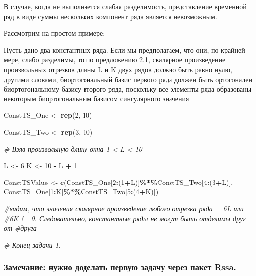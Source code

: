 \documentclass[
]{article}
\newenvironment{Shaded}{\begin{snugshade}}{\end{snugshade}}
\newcommand{\CommentTok}[1]{\textcolor[rgb]{0.56,0.35,0.01}{\textit{#1}}}
\newcommand{\DecValTok}[1]{\textcolor[rgb]{0.00,0.00,0.81}{#1}}
\newcommand{\FunctionTok}[1]{\textcolor[rgb]{0.13,0.29,0.53}{\textbf{#1}}}
\newcommand{\NormalTok}[1]{#1}
\newcommand{\OtherTok}[1]{\textcolor[rgb]{0.56,0.35,0.01}{#1}}
\newcommand{\SpecialCharTok}[1]{\textcolor[rgb]{0.81,0.36,0.00}{\textbf{#1}}}
\begin{document}
В случае, когда не выполняется слабая разделимость, представление
временной ряд в виде суммы нескольких компонент ряда является
невозможным.

Рассмотрим на простом примере:

Пусть дано два константных ряда. Если мы предполагаем, что они, по
крайней мере, слабо разделимы, то по предложению 2.1, скалярное
произведение произвольных отрезков длины L и K двух рядов должно быть
равно нулю, другими словами, биортогональный базис первого ряда должен
быть ортогонален биортогональному базису второго ряда, поскольку все
элементы ряда образованы некоторым биортогональным базисом сингулярного
значения

\begin{Shaded}
\begin{Highlighting}[]
\NormalTok{ConstTS\_One }\OtherTok{\textless{}{-}} \FunctionTok{rep}\NormalTok{(}\DecValTok{2}\NormalTok{, }\DecValTok{10}\NormalTok{)}

\NormalTok{ConstTS\_Two }\OtherTok{\textless{}{-}} \FunctionTok{rep}\NormalTok{(}\DecValTok{3}\NormalTok{, }\DecValTok{10}\NormalTok{)}

\CommentTok{\# Взяв произвольную длину окна 1 \textless{} L \textless{} 10}

\NormalTok{L }\OtherTok{\textless{}{-}} \DecValTok{6} 
\NormalTok{K }\OtherTok{\textless{}{-}} \DecValTok{10} \SpecialCharTok{{-}}\NormalTok{ L }\SpecialCharTok{+} \DecValTok{1}

\NormalTok{ConstTSValue }\OtherTok{\textless{}{-}} \FunctionTok{c}\NormalTok{(ConstTS\_One[}\DecValTok{2}\SpecialCharTok{:}\NormalTok{(}\DecValTok{1}\SpecialCharTok{+}\NormalTok{L)]}\SpecialCharTok{\%*\%}\NormalTok{ConstTS\_Two[}\DecValTok{4}\SpecialCharTok{:}\NormalTok{(}\DecValTok{3}\SpecialCharTok{+}\NormalTok{L)],}
\NormalTok{ConstTS\_One[}\DecValTok{1}\SpecialCharTok{:}\NormalTok{K]}\SpecialCharTok{\%*\%}\NormalTok{ConstTS\_Two[}\DecValTok{5}\SpecialCharTok{:}\NormalTok{(}\DecValTok{4}\SpecialCharTok{+}\NormalTok{K)])}

\CommentTok{\#видим, что значения скалярное произведение любого отрезка ряда = 6L или}
\CommentTok{\#6K != 0. Следовательно, константные ряды не могут быть отделимы друг от}
\CommentTok{\#друга}

\CommentTok{\# Конец задачи 1.}
\end{Highlighting}
\end{Shaded}

\subsubsection{Замечание: нужно доделать первую задачу через пакет
Rssa.}\label{ux437ux430ux43cux435ux447ux430ux43dux438ux435-ux43dux443ux436ux43dux43e-ux434ux43eux434ux435ux43bux430ux442ux44c-ux43fux435ux440ux432ux443ux44e-ux437ux430ux434ux430ux447ux443-ux447ux435ux440ux435ux437-ux43fux430ux43aux435ux442-rssa.}
\end{document}
